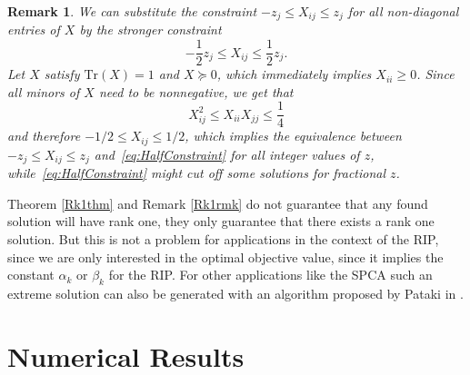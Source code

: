 \documentclass[journal]{IEEEtran}
\newtheorem{remark}{Remark}
\newcommand{\Tr}{\text{Tr}}
\begin{document}
\begin{remark}\label{HalfConstraint}
We can substitute the constraint $-z_j \leq X_{ij} \leq z_j$ for all non-diagonal entries of $X$ by the stronger constraint 
\begin{equation}\label{eq:HalfConstraint}
  -\frac{1}{2}z_j \leq X_{ij} \leq \frac{1}{2}z_j.
\end{equation}
Let $X$ satisfy $\Tr(X)=1$ and $X\succeq 0$, which immediately implies $X_{ii}\geq 0$.
Since all minors of $X$ need to be nonnegative, we get that
\begin{equation*}
  X_{ij}^2 \leq  X_{ii} X_{jj} \leq \frac{1}{4}
\end{equation*}
and therefore $-1/2 \leq X_{ij} \leq 1/2$, which implies the equivalence between
$-z_j \leq X_{ij} \leq z_j$ and~\eqref{eq:HalfConstraint} for all integer values 
of $z$, while~\eqref{eq:HalfConstraint} might cut off some solutions for fractional $z$.
\end{remark}

Theorem \ref{Rk1thm} and Remark \ref{Rk1rmk} do not guarantee that any found solution will have rank one, they only guarantee that there exists a rank one solution. But this is not a problem for applications in the context of the RIP, 
since we are only interested in the optimal objective value, since it implies the constant $\alpha_k$ or $\beta_k$ for the RIP. For other applications like the SPCA such an extreme solution can also be generated with an algorithm 
proposed by Pataki in \cite{coneLP}.

\section{Numerical Results}
\label{sec:numerical_results}
\end{document}
